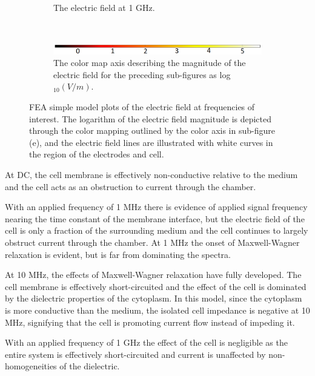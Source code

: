 \begin{figure}[h]
\begin{subfigure}[b]{\textwidth}
        \caption{The electric field at 1 GHz.}
    \end{subfigure}
        \\
    \vspace{0.1 in}
    \begin{subfigure}[b]{\textwidth}
        \centering
        \includegraphics[width=\textwidth]{images/simpleCellColorMapAxis.png}
        \caption{The color map axis describing the magnitude of the electric field for the preceding sub-figures as log$_{10}(V/m)$.}
    \end{subfigure}
    \caption[FEA simple model electric field surface plot.]{FEA simple model plots of the electric field at frequencies of interest. The logarithm of the electric field magnitude is depicted through the color mapping outlined by the color axis in sub-figure (e), and the electric field lines are illustrated with white curves in the region of the electrodes and cell.}
    \label{fig:single_cell_model_EZ_plots}
\end{figure}

\par At DC, the cell membrane is effectively non-conductive relative to the medium and the cell acts as an obstruction to current through the chamber. 
\par With an applied frequency of 1 MHz there is evidence of applied signal frequency nearing the time constant of the membrane interface, but the electric field of the cell is only a fraction of the surrounding medium and the cell continues to largely obstruct current through the chamber. At 1 MHz the onset of Maxwell-Wagner relaxation is evident, but is far from dominating the spectra. 

\par At 10 MHz, the effects of Maxwell-Wagner relaxation have fully developed. The cell membrane is effectively short-circuited and the effect of the cell is dominated by the dielectric properties of the cytoplasm. In this model, since the cytoplasm is more conductive than the medium, the isolated cell impedance is negative at 10 MHz, signifying that the cell is promoting current flow instead of impeding it. 

\par With an applied frequency of 1 GHz the effect of the cell is negligible as the entire system is effectively short-circuited and current is unaffected by non-homogeneities of the dielectric. 


